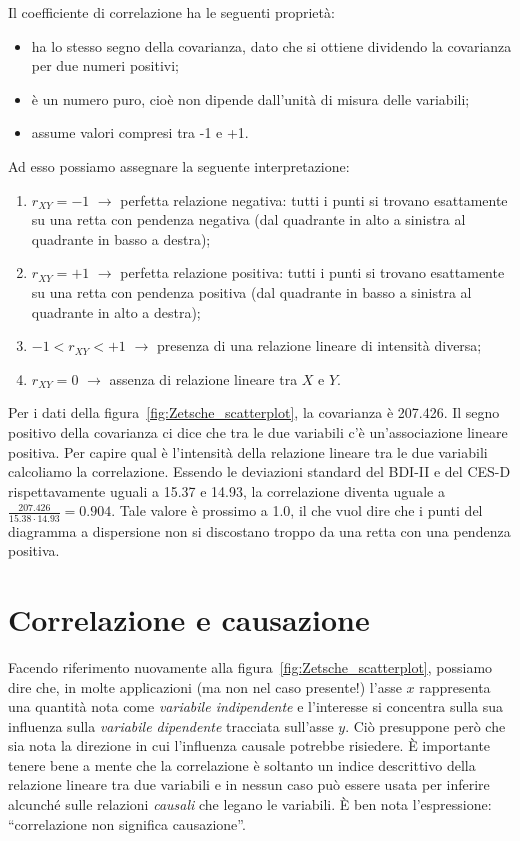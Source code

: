 Il coefficiente di correlazione ha le seguenti proprietà:
\begin{itemize}
\item ha lo stesso segno della covarianza, dato che si ottiene dividendo la covarianza per due numeri positivi; 
\item è un numero puro, cioè non dipende dall'unità di misura delle variabili; 
\item assume valori compresi tra -1 e +1.
\end{itemize}
Ad esso possiamo assegnare la seguente interpretazione:
\begin{enumerate}[label=(\alph*)]
\item $r_{XY} = -1$ $\rightarrow$ perfetta relazione negativa: tutti i punti si trovano esattamente su una retta con pendenza negativa (dal quadrante in alto a sinistra al quadrante in basso a destra);
\item $r_{XY} = +1$ $\rightarrow$ perfetta relazione positiva: tutti i punti si trovano esattamente su una retta con pendenza positiva (dal quadrante in basso a sinistra al quadrante in alto a destra);
\item $-1 < r_{XY} < +1$ $\rightarrow$ presenza di una relazione lineare di intensità diversa;
\item $r_{XY} = 0$ $\rightarrow$ assenza di relazione lineare tra $X$ e $Y$.
\end{enumerate}

\bigskip

\begin{exmp}

Per i dati della figura~\ref{fig:Zetsche_scatterplot}, la covarianza è 207.426.
Il segno positivo della covarianza ci dice che tra le due variabili c'è un'associazione lineare positiva.
Per capire qual è l'intensità della relazione lineare tra le due variabili calcoliamo la correlazione. 
Essendo le deviazioni standard del BDI-II e del CES-D rispettavamente uguali  a 15.37 e 14.93, la correlazione diventa uguale a
$\frac{207.426}{15.38 \cdot 14.93} = 0.904.$ 
Tale valore è prossimo a 1.0, il che vuol dire che i punti del diagramma a dispersione non si discostano troppo da una retta con una pendenza positiva.
\end{exmp}

\section{Correlazione e causazione}

Facendo riferimento nuovamente alla figura~\ref{fig:Zetsche_scatterplot}, possiamo dire che, in molte applicazioni (ma non nel caso presente!) l'asse $x$ rappresenta una quantità nota come \emph{variabile indipendente} e l'interesse si concentra sulla sua influenza sulla \emph{variabile dipendente} tracciata sull'asse $y$. 
Ciò presuppone però che sia nota la direzione in cui l'influenza causale potrebbe risiedere.
È importante tenere bene a mente che la correlazione è soltanto un indice descrittivo della relazione lineare tra due variabili e in nessun caso può essere usata per inferire alcunché sulle relazioni \emph{causali} che legano le variabili.
È ben nota l'espressione: \enquote{correlazione non significa causazione}. 

